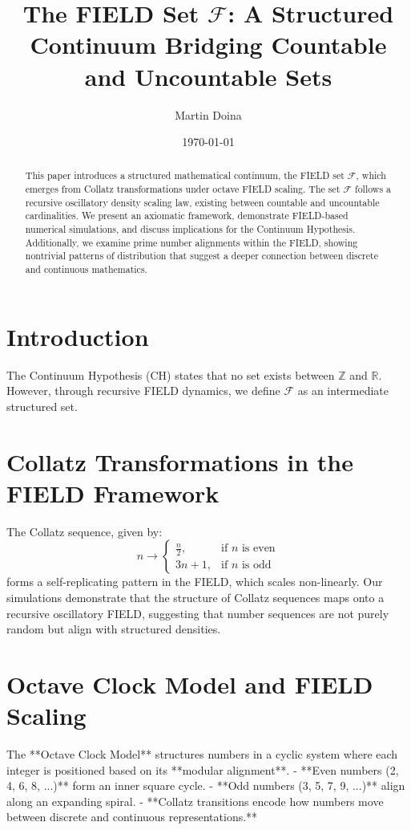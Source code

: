 \documentclass{article}
\title{The FIELD Set \( \mathcal{F} \): A Structured Continuum Bridging Countable and Uncountable Sets}
\author{Martin Doina}  %
\date{\today}  %
\begin{document}
\maketitle

\begin{abstract}
This paper introduces a structured mathematical continuum, the FIELD set \( \mathcal{F} \), which emerges from Collatz transformations under octave FIELD scaling. The set \( \mathcal{F} \) follows a recursive oscillatory density scaling law, existing between countable and uncountable cardinalities. We present an axiomatic framework, demonstrate FIELD-based numerical simulations, and discuss implications for the Continuum Hypothesis. Additionally, we examine prime number alignments within the FIELD, showing nontrivial patterns of distribution that suggest a deeper connection between discrete and continuous mathematics.
\end{abstract}

\section{Introduction}
The Continuum Hypothesis (CH) states that no set exists between \( \mathbb{Z} \) and \( \mathbb{R} \). However, through recursive FIELD dynamics, we define \( \mathcal{F} \) as an intermediate structured set.

\section{Collatz Transformations in the FIELD Framework}
The Collatz sequence, given by:
\begin{equation}
n \rightarrow \begin{cases} 
\frac{n}{2}, & \text{if } n \text{ is even} \\
3n+1, & \text{if } n \text{ is odd}
\end{cases}
\end{equation}
forms a self-replicating pattern in the FIELD, which scales non-linearly. Our simulations demonstrate that the structure of Collatz sequences maps onto a recursive oscillatory FIELD, suggesting that number sequences are not purely random but align with structured densities.

\section{Octave Clock Model and FIELD Scaling}
The **Octave Clock Model** structures numbers in a cyclic system where each integer is positioned based on its **modular alignment**.  
- **Even numbers (2, 4, 6, 8, ...)** form an inner square cycle.
- **Odd numbers (3, 5, 7, 9, ...)** align along an expanding spiral.  
- **Collatz transitions encode how numbers move between discrete and continuous representations.**
\end{document}
